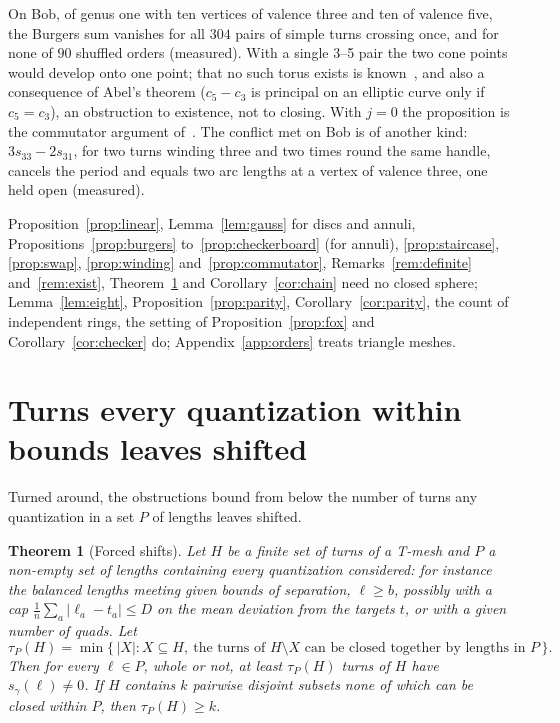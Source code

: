 \documentclass[11pt,a4paper]{article}
\newtheorem{theorem}{Theorem}
\newcommand{\shift}{s}
\newcommand{\lean}[1]{\texttt{\detokenize{#1}}}
\newenvironment{evidence}[3][]{}{}
\begin{document}
On Bob, of genus one with ten vertices of valence three and ten of valence
five, the Burgers sum vanishes for all $304$ pairs of simple turns crossing
once, and for none of $90$ shuffled orders (measured). With a single 3--5
pair the two cone points would develop onto one point; that no such torus
exists is known~\cite{izmestiev2013torus}, and also a consequence of Abel's theorem
($c_5 - c_3$ is principal on an elliptic curve only if $c_5 = c_3$), an
obstruction to existence, not to closing. With $j = 0$ the proposition is the
commutator argument of~\cite[\S7]{izmestiev2013torus}. The conflict met on
Bob is of another kind: $3\shift_{33} - 2\shift_{31}$, for two turns winding
three and two times round the same handle, cancels the period and equals two
arc lengths at a vertex of valence three, one held open (measured).

Proposition~\ref{prop:linear}, Lemma~\ref{lem:gauss} for discs and annuli,
Propositions~\ref{prop:burgers} to~\ref{prop:checkerboard} (for annuli),
\ref{prop:staircase}, \ref{prop:swap}, \ref{prop:winding}
and~\ref{prop:commutator}, Remarks~\ref{rem:definite} and~\ref{rem:exist},
Theorem~\ref{thm:forced} and Corollary~\ref{cor:chain} need no closed sphere;
Lemma~\ref{lem:eight}, Proposition~\ref{prop:parity},
Corollary~\ref{cor:parity}, the count of independent rings, the setting of
Proposition~\ref{prop:fox} and Corollary~\ref{cor:checker} do; Appendix~\ref{app:orders} treats triangle
meshes.

\section{Turns every quantization within bounds leaves shifted}\label{sec:forced}

Turned around, the obstructions bound from below the number of turns any
quantization in a set $P$ of lengths leaves shifted.

\begin{evidence}{lean}{\lean{forced_helices}, \lean{card_ge_of_disjoint}, \lean{tauP_ge_of_disjoint}, \lean{TMesh.forced_of_certificates}}
\begin{theorem}[Forced shifts]\label{thm:forced}
Let $H$ be a finite set of turns of a T-mesh and $P$ a non-empty set of lengths
containing every quantization considered: for instance the balanced lengths
meeting given bounds of separation, $\ell \ge b$, possibly with a cap $\frac1n
\sum_a |\ell_a - t_a| \le D$ on the mean deviation from the targets $t$, or with
a given number of quads. Let
\[
  \tau_P(H) = \min\bigl\{\, |X| : X \subseteq H,\ \text{the turns of } H
  \setminus X \text{ can be closed together by lengths in } P \,\bigr\}.
\]
Then for every $\ell \in P$, whole or not, at least $\tau_P(H)$ turns of $H$
have $\shift_\gamma(\ell) \neq 0$. If $H$ contains $k$ pairwise disjoint subsets
none of which can be closed within $P$, then $\tau_P(H) \ge k$.
\end{theorem}
\end{evidence}
\end{document}
